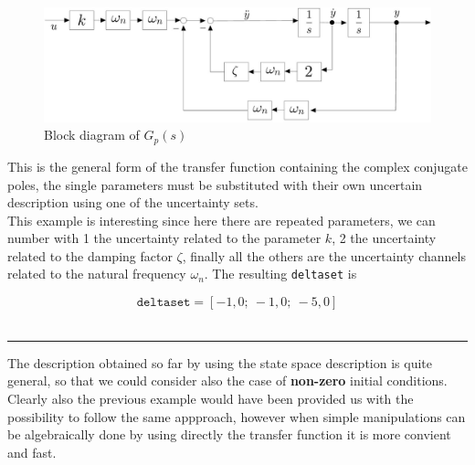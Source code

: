\documentclass[a4paper, 12pt]{article}
\begin{document}
\begin{figure}[h]
    \centering
    \includegraphics[scale=0.3]{img/complex.jpg}
    \caption{Block diagram of $G_p(s)$}
\end{figure}
\newpage
\noindent
This is the general form of the transfer function containing the complex conjugate poles, the single parameters must be substituted with their own uncertain description using one of the uncertainty sets.\\
 This example is interesting since here there are repeated parameters, we can number with 1 the uncertainty related to the parameter $k$, 2 the uncertainty related to the damping factor $\zeta$, finally all the others are the uncertainty channels related to the natural frequency $\omega_n$. The resulting \texttt{deltaset} is
 
 \begin{equation}
    \texttt{deltaset}=[
        -1,0; \
        -1,0; \
        -5,0
    ]
 \end{equation}\\

\hrule
\vspace{0.3em}
\noindent
\textsf{The description obtained so far by using the state space description is quite general, so that we could consider also the case of \textbf{non-zero} initial conditions. Clearly also the previous example would have been provided us with the possibility to follow the same appproach, however when simple manipulations can be algebraically done by using directly the transfer function it is more convient and fast.}
\end{document}
